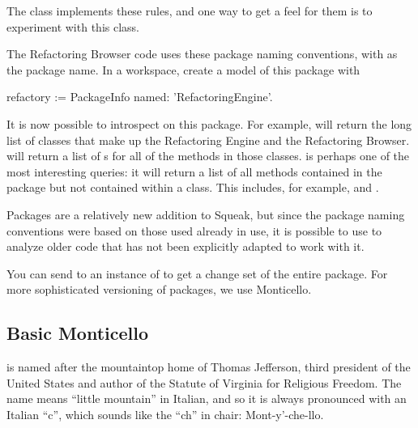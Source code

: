 \documentclass[a4paper,10pt,twoside]{book}
\begin{document}
The class  implements these rules, and one way to get a feel for them is to experiment with this class.

The Refactoring Browser code uses these package naming conventions, with  as the package name. In a workspace, create a model of this package with

\begin{code}{}
refactory := PackageInfo named: 'RefactoringEngine'. 
\end{code}

It is now possible to introspect on this package. 
For example,  will return the long list of classes that make up the Refactoring Engine and the Refactoring Browser.  
will return a list of s for all of the methods in those classes.  is perhaps one of the most interesting queries: it will return a list of all methods contained in the  package but not contained within a  class. This includes, for example,  and .

Packages are a relatively new addition to Squeak, but since the package naming conventions were based on those used already in use, it is possible to use  to analyze older code that has not been explicitly adapted to work with it.


You can send  to an instance of  to get a change set of the
entire package.  For more sophisticated versioning of packages, we use Monticello.

\subsection{Basic Monticello}

 is named after the mountaintop home of Thomas Jefferson, third president of the United States and author of the Statute of Virginia for Religious Freedom.  The name means ``little mountain'' in Italian, and so it is always pronounced with an Italian ``c'', which sounds like the ``ch'' in chair: Mont-y'-che-llo.
\end{document}
